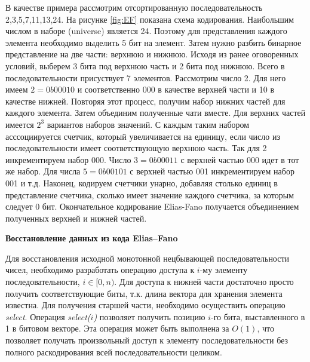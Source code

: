 В качестве примера рассмотрим отсортированную последовательность {2,3,5,7,11,13,24}.
На рисунке \ref{fig:EF} показана схема кодирования. Наибольшим числом в наборе (universe) является 24.
Поэтому для представления каждого элемента необходимо выделить 5 бит на элемент.
Затем нужно разбить бинарное представление на две части: верхнюю и нижнюю.
Исходя из ранее оговоренных условий, выберем 3 бита под верхнюю часть и 2 бита под нижнюю.
Всего в последовательности присуствует 7 элементов. Рассмотрим число 2. Для него имеем
$2 = 0b00010$ и соответственно 000 в качестве верхней части и 10 в качестве нижней.
Повторяя этот процесс, получим набор нижних частей для каждого элемента.
Затем объединим полученные чати вместе. Для верхних частей имеется $2^3$ вариантов
наборов значений. С каждым таким набором асссоциируется счетчик, который увеличивается на единицу,
если число из последовательности имеет соответствующую верхнюю часть.
Так для 2 инкрементируем набор 000. Число $3 = 0b00011$ с верхней частью 000 идет в тот же набор.
Для числа $5 = 0b00101$ с верхней частью 001 инкрементируем набор 001 и т.д.
Наконец, кодируем счетчики унарно, добавляя столько единиц в представление счетчика,
сколько имеет значение каждого счетчика, за которым следует 0 бит.
Окончательное кодирование Elias-Fano получается объединением полученных верхней и нижней частей.

\textbf{Восстановление данных из кода Elias--Fano}

Для восстановления исходной монотонной нецбывающей последовательности чисел, необходимо разработать операцию
доступа к $i$-му элементу последовательности, $i \in [0, n)$. Для доступа к нижней части
достаточно просто получить соответствующие биты, т.к. длина вектора для хранения элемента известна.
Для получения старшей части, необходимо осуществить операцию \emph{select}.
Операция \emph{select($i$)} позволяет получить позицию $i$-го бита, выставленного в 1 в битовом векторе.
Эта операция может быть выполнена за $O(1)$, что позволяет получать произвольный доступ к элементу
последовательности без полного раскодирования всей последовательности целиком.